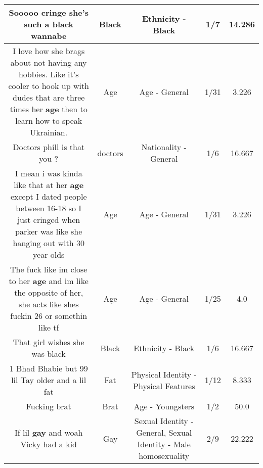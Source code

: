 \documentclass[11pt]{article}
\newlength\mylength
\begin{document}
\begin{center}
\begin{longtable}{|C{.65\mylength}|C{.30\mylength}|C{.12\mylength}|C{.12\mylength}|C{.12\mylength}|}
  \small Sooooo cringe she's such a \textbf{black} wannabe\normalsize   & Black & Ethnicity - Black & 1/7 & 14.286 \\  \hline
  \small I love how she brags about not having any hobbies. Like it's cooler to hook up with dudes that are three times her \textbf{age} then to learn how to speak Ukrainian.\normalsize   & Age & Age - General & 1/31 & 3.226 \\  \hline
  \small Doctors phill is that you ?\normalsize   & doctors & Nationality - General & 1/6 & 16.667 \\  \hline
  \small I mean i was kinda like that at her \textbf{age} except I dated people between 16-18 so I just cringed when parker was like she hanging out with 30 year olds\normalsize   & Age & Age - General & 1/31 & 3.226 \\  \hline
  \small The fuck like im close to her \textbf{age} and im like the opposite of her, she acts like shes fuckin 26 or somethin like tf\normalsize   & Age & Age - General & 1/25 & 4.0 \\  \hline
  \small That girl wishes she was black\normalsize   & Black & Ethnicity - Black & 1/6 & 16.667 \\  \hline
  \small 1 Bhad Bhabie but 99 lil Tay older and a lil fat\normalsize   & Fat & Physical Identity - Physical Features & 1/12 & 8.333 \\  \hline
  \small Fucking brat\normalsize   & Brat & Age - Youngsters & 1/2 & 50.0 \\  \hline
  \small If lil \textbf{g\textbf{ay}} and woah Vicky had a kid\normalsize   & Gay & Sexual Identity - General, Sexual Identity - Male homosexuality & 2/9 & 22.222 \\  \hline

\end{longtable}
\end{center}
\end{document}
